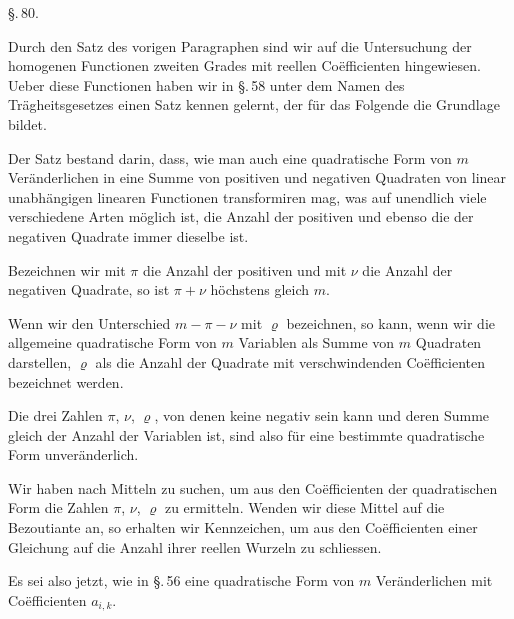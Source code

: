 
\begin{center}
\S.\,80.

\end{center}

Durch den Satz des vorigen Paragraphen sind wir auf die Untersuchung der homogenen Functionen zweiten Grades mit reellen Coëfficienten hingewiesen. Ueber diese Functionen haben wir in \S.\,58 unter dem Namen des Trägheitsgesetzes einen Satz kennen gelernt, der für das Folgende die Grundlage bildet.

Der Satz bestand darin, dass, wie man auch eine quadratische Form von $m$ Veränderlichen in eine Summe von positiven und negativen Quadraten von linear unabhängigen linearen Functionen transformiren mag, was auf unendlich viele verschiedene Arten möglich ist, die Anzahl der positiven und ebenso die der negativen Quadrate immer dieselbe ist.

Bezeichnen wir mit $\pi$ die Anzahl der positiven und mit $\nu$ die Anzahl der negativen Quadrate, so ist $\pi + \nu$ höchstens gleich $m$.

Wenn wir den Unterschied $m - \pi - \nu$ mit $\varrho$ bezeichnen, so kann, wenn wir die allgemeine quadratische Form von $m$ Variablen als Summe von $m$ Quadraten darstellen, $\varrho$ als die Anzahl der Quadrate mit verschwindenden Coëfficienten bezeichnet werden.

Die drei Zahlen $\pi$, $\nu$, $\varrho$, von denen keine negativ sein kann und deren Summe gleich der Anzahl der Variablen ist,
sind also für eine bestimmte quadratische Form unveränderlich.

Wir haben nach Mitteln zu suchen, um aus den Coëfficienten der quadratischen Form die Zahlen $\pi$, $\nu$, $\varrho$ zu ermitteln. Wenden wir diese Mittel auf die Bezoutiante an, so erhalten wir Kennzeichen, um aus den Coëfficienten einer Gleichung auf die Anzahl ihrer reellen Wurzeln zu schliessen.

Es sei also jetzt, wie in \S.\,56
eine quadratische Form von $m$ Veränderlichen mit  Coëfficienten $a_{i,k}$.
